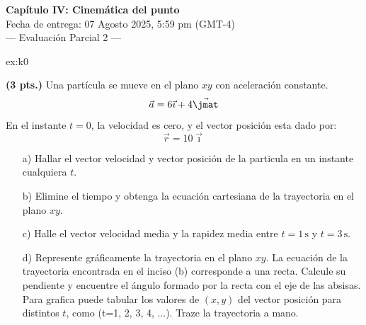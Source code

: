  \begin{multicols}{2}
     \begin{center}
         \LARGE{\textbf{Capítulo IV: Cinemática del punto}}\\	
         \vspace{0.2cm}
         \large{Fecha de entrega: 07 Agosto 2025, 5:59 pm (GMT-4)}\\
         \large{— Evaluación Parcial 2 —}
     \end{center}
    
     \begin{excercise}[][][]{ex:k0}{
        \textbf{(3 pts.)} Una partícula se mueve en el plano $xy$ con aceleración constante.        
        \begin{equation*}
            \vec{a}=6\vec{\imath}+4\vec{\jmat}
        \end{equation*}
        En el instante $t=0$, la velocidad es cero, y el vector posición esta dado por:
        \begin{equation*}
            \vec{r}=10\vec{\imath}
        \end{equation*}
        \begin{itemize}
            \item[a)] Hallar el vector velocidad y vector posición de la particula en un instante cualquiera $t$.
            \item[b)] Elimine el tiempo y obtenga la ecuación cartesiana de la trayectoria en el plano $xy$.
            \item[c)] Halle el vector velocidad media y la rapidez media entre $t=1\,\mathrm{s}$ y $t=3\,\mathrm{s}$.
            \item[d)] Represente gráficamente la trayectoria en el plano $xy$. La ecuación de la trayectoria encontrada en el inciso (b) corresponde a una recta. Calcule su pendiente y encuentre el ángulo formado por la recta con el eje de las absisas. Para grafica puede tabular los valores de $(x,y)$ del vector posición para distintos $t$, como (t=1, 2, 3, 4, ...). Traze la trayectoria a mano. 
        \end{itemize}
         }
     \end{excercise} 


\end{multicols}
